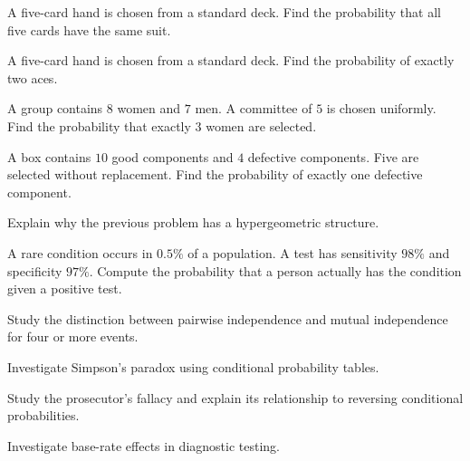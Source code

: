 \begin{exercise}[3]
A five-card hand is chosen from a standard deck. Find the probability
that all five cards have the same suit.
\end{exercise}

\begin{exercise}[3]
A five-card hand is chosen from a standard deck. Find the probability
of exactly two aces.
\end{exercise}

\begin{exercise}[3]
A group contains \(8\) women and \(7\) men. A committee of \(5\) is
chosen uniformly. Find the probability that exactly \(3\) women are
selected.
\end{exercise}

\begin{exercise}[3]
A box contains \(10\) good components and \(4\) defective components.
Five are selected without replacement. Find the probability of exactly
one defective component.
\end{exercise}

\begin{exercise}[3]
Explain why the previous problem has a hypergeometric structure.
\end{exercise}

\begin{exercise}[3]
A rare condition occurs in \(0.5\%\) of a population. A test has
sensitivity \(98\%\) and specificity \(97\%\). Compute the probability
that a person actually has the condition given a positive test.
\end{exercise}

\begin{exercise}[4]
Study the distinction between pairwise independence and mutual
independence for four or more events.
\end{exercise}

\begin{exercise}[4]
Investigate Simpson's paradox using conditional probability tables.
\end{exercise}

\begin{exercise}[4]
Study the prosecutor's fallacy and explain its relationship to reversing
conditional probabilities.
\end{exercise}

\begin{exercise}[4]
Investigate base-rate effects in diagnostic testing.
\end{exercise}

